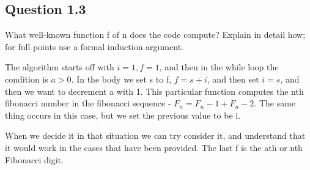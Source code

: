 \documentclass[11pt, oneside]{article}   	%
\begin{document}
\subsection{Question 1.3}
\par What well-known function f of n does the code compute? Explain in detail how; for full points use a formal induction argument.
\par The algorithm starts off with $i = 1, f = 1$, and then in the while loop the condition is $a > 0$. In the body we set s to f, $f = s + i$, and then set $i = s$, and then we want to decrement a with 1. This particular function computes the nth fibonacci number in the fibonacci sequence - $F_n = F_n-1 + F_n-2$. The same thing occurs in this case, but we set the previous value to be i.
\par When we decide it in that situation we can try consider it, and understand that it would work in the cases that have been provided. The last f is the ath or nth Fibonacci digit. 
\end{document}
